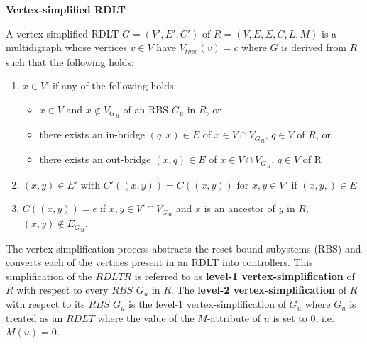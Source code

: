         \begin{definition} \textbf{Vertex-simplified RDLT} \cite{malinao-rdlt}

            A vertex-simplified RDLT $G = (V',E',C')$ of $ R = (V,E,\Sigma,C,L,M)$ is a multidigraph whose vertices $v \in V$ have $V_{type}(v) = c$ where $G$ is derived from $R$ such that the following holds:

            \begin{enumerate}
                
                \item $x \in V'$ if any of the following holds:
                    \begin{itemize}
                        
                        \item $x \in V$ and $x \notin {V_G}_u$ of an RBS $G_u$ in $R$, or

                        \item there exists an in-bridge $(q,x) \in E$ of $x \in V \cap {V_G}_u$, $q \in V$ of $R$, or

                        \item there exists an out-bridge $(x,q) \in E$ of $x \in V \cap {V_G}_u$, $q \in V$ of R
                        
                    \end{itemize}

                \item $(x,y) \in E'$ with $C'((x,y)) = C((x,y))$ for $x,y \in V'$ if $(x,y,) \in E$

                \item $C((x,y)) = \epsilon$ if $x,y \in V' \cap {V_G}_u$ and $x$ is an ancestor of $y$ in $R$, $(x,y) \notin {E_G}_u$.
                
            \end{enumerate}
        
        \end{definition}

        The vertex-simplification process abstracts the reset-bound subystems (RBS) and converts each of the vertices present in an RDLT into controllers. This simplification of the $RDLT R$ is referred to as \textbf{level-1 vertex-simplification} of $R$ with respect to every $RBS$ $G_{u}$ in $R$. The \textbf{level-2 vertex-simplification} of $R$ with respect to its $RBS$ $G_{u}$ is the level-1 vertex-simplification of $G_{u}$ where $G_{u}$ is treated as an $RDLT$ where the value of the $M$-attribute of $u$ is set to $0$, i.e. $M(u) = 0$.

